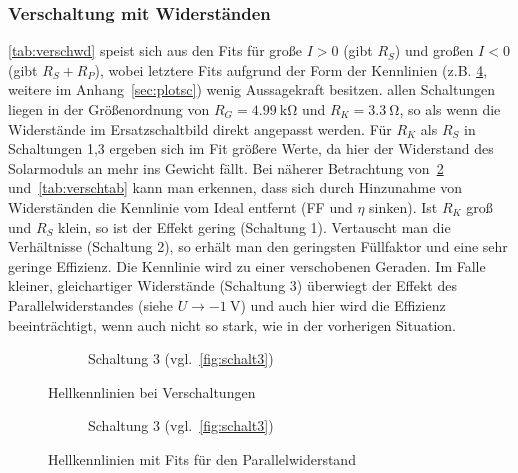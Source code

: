\documentclass[slug=SZ, room=Hermann-Krone-Bau\,\ Labor\ 1.25,
supervisor=Martin\ Kroll, coursedate=14.\ 11.\ 2019]{../../Lab_Report_LaTeX/lab_report}
\begin{document}
\subsubsection{Verschaltung mit Widerst\"anden}
\label{sec:verschanal}

\ref{tab:verschwd} speist sich aus den Fits f\"ur gro\ss{}e \(I>0\)
(gibt \(R_S\)) und gro\ss{}en \(I<0\) (gibt \(R_S+R_P\)), wobei
letztere Fits aufgrund der Form der Kennlinien
(z.B. \ref{fig:hellkennfit}, weitere im Anhang~\ref{sec:plotsc}) wenig
Aussagekraft besitzen.  allen Schaltungen liegen in der
Gr\"o\ss{}enordnung von \(R_G=\SI{4.99}{\kilo\ohm}\) und
\(R_K=\SI{3.3}{\ohm}\), so als wenn die Widerst\"ande im
Ersatzschaltbild direkt angepasst werden. F\"ur \(R_K\) als \(R_S\) in
Schaltungen 1,3 ergeben sich im Fit gr\"o\ss{}ere Werte, da hier der
Widerstand des Solarmoduls an mehr ins Gewicht f\"allt. Bei n\"aherer
Betrachtung von~\ref{fig:hellkenn} und~\ref{tab:verschtab} kann man
erkennen, dass sich durch Hinzunahme von Widerst\"anden die Kennlinie
vom Ideal entfernt (FF und \(\eta\) sinken). Ist \(R_K\) gro\ss{} und
\(R_S\) klein, so ist der Effekt gering (Schaltung 1). Vertauscht man
die Verh\"altnisse (Schaltung 2), so erh\"alt man den geringsten
F\"ullfaktor und eine sehr geringe Effizienz. Die Kennlinie wird zu
einer verschobenen Geraden. Im Falle kleiner, gleichartiger
Widerst\"ande (Schaltung 3) \"uberwiegt der Effekt des
Parallelwiderstandes (siehe \(U\rightarrow \SI{-1}{\volt}\)) und auch
hier wird die Effizienz beeinträchtigt, wenn auch nicht so stark, wie
in der vorherigen Situation.
\begin{figure}[H]\centering
  \ContinuedFloat
  \begin{subfigure}[b]{1\textwidth}\centering
    
    \caption{Schaltung 3 (vgl.~\ref{fig:schalt3})}
    \label{diag:hellschalt3}
  \end{subfigure}
  \caption{Hellkennlinien bei Verschaltungen}
  \label{fig:hellkenn}
\end{figure}
\begin{figure}[H]\centering
  \ContinuedFloat
  \begin{subfigure}[b]{1\textwidth}\centering
    
    \caption{Schaltung 3 (vgl.~\ref{fig:schalt3})}
    \label{diag:hellschalt3fit}
  \end{subfigure}
  \caption{Hellkennlinien mit Fits f\"ur den Parallelwiderstand}
  \label{fig:hellkennfit}
\end{figure}
\end{document}
